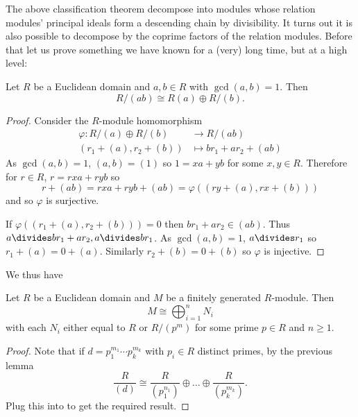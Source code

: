 \documentclass[a4paper]{article}
\begin{document}
The above classification theorem decompose into modules whose relation modules' principal ideals form a descending chain by divisibility. It turns out it is also possible to decompose by the coprime factors of the relation modules. Before that let us prove something we have known for a (very) long time, but at a high level:

\begin{lemma}
  Let \(R\) be a Euclidean domain and \(a, b \in R\) with \(\gcd(a, b) = 1\). Then
  \[
    R/(ab) \cong R(a) \oplus R/(b).
  \]
\end{lemma}

\begin{proof}
  Consider the \(R\)-module homomorphism
  \begin{align*}
    \varphi: R/(a) \oplus R/(b) &\to R/(ab) \\
    (r_1 + (a), r_2 + (b)) &\mapsto br_1 + ar_2 + (ab)
  \end{align*}
  As \(\gcd(a, b) = 1\), \((a, b) = (1)\) so \(1 = xa + yb\) for some \(x, y \in R\). Therefore for \(r \in R\), \(r = rxa + ryb\) so
  \[
    r + (ab) = rxa + ryb + (ab) = \varphi((ry + (a), rx + (b)))
  \]
  and so \(\varphi\) is surjective.

  If \(\varphi((r_1 + (a), r_2 + (b))) = 0\) then \(br_1 + ar_2 \in (ab)\). Thus \(a \divides br_1 + ar_2, a \divides br_1\). As \(\gcd(a, b) = 1\), \(a \divides r_1\) so \(r_1 + (a) = 0 + (a)\). Similarly \(r_2 + (b) = 0 + (b)\) so \(\varphi\) is injective.
\end{proof}

We thus have

\begin{theorem}
  \label{thm:primary decomposition}
  Let \(R\) be a Euclidean domain and \(M\) be a finitely generated \(R\)-module. Then
  \[
    M \cong \bigoplus_{i = 1}^n N_i
  \]
  with each \(N_i\) either equal to \(R\) or \(R/(p^m)\) for some prime \(p \in R\) and \(n \geq 1\).
\end{theorem}

\begin{proof}
  Note that if \(d = p_1^{m_1} \cdots p_k^{m_k}\) with \(p_i \in R\) distinct primes, by the previous lemma
  \[
    \frac{R}{(d)} \cong \frac{R}{(p_1^{n_1})} \oplus \dots \oplus \frac{R}{(p_k^{m_k})}.
  \]
  Plug this into  to get the required result.
\end{proof}
\end{document}
